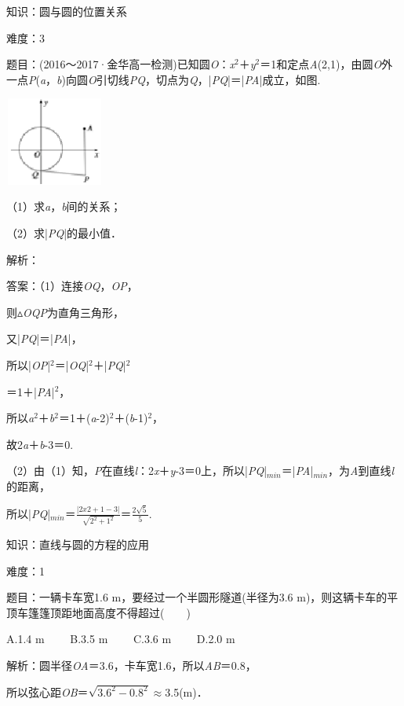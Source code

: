 \documentclass{article} %
\begin{document}
知识：圆与圆的位置关系

难度：3

题目：(2016～2017·金华高一检测)已知圆\textit{O}：\textit{x}${}^{2}$＋\textit{y}${}^{2}$＝1和定点\textit{A}(2,1)，由圆\textit{O}外一点\textit{P}(\textit{a}，\textit{b})向圆\textit{O}引切线\textit{PQ}，切点为\textit{Q}，|\textit{PQ}|＝|\textit{PA}|成立，如图.

\includegraphics*[width=1.28in, height=1.14in, keepaspectratio=false]{image295}

（1）求\textit{a}，\textit{b}间的关系；

（2）求|\textit{PQ}|的最小值．

解析：

答案：（1）连接\textit{OQ}，\textit{OP}，

则$\mathrm{\vartriangle}$\textit{OQP}为直角三角形，

又|\textit{PQ}|＝|\textit{PA}|，

所以|\textit{OP}|${}^{2}$＝|\textit{OQ}|${}^{2}$＋|\textit{PQ}|${}^{2}$

＝1＋|\textit{PA}|${}^{2}$，

所以\textit{a}${}^{2}$＋\textit{b}${}^{2}$＝1＋(\textit{a}-2)${}^{2}$＋(\textit{b}-1)${}^{2}$，

故2\textit{a}＋\textit{b}-3＝0.

（2）由（1）知，\textit{P}在直线\textit{l}：2\textit{x}＋\textit{y}-3＝0上，所以|\textit{PQ}|${}_{min}$＝|\textit{PA}|${}_{min}$，为\textit{A}到直线\textit{l}的距离，

所以|\textit{PQ}|${}_{min}$＝$\frac{|2x2+1-3|}{\sqrt{2^2+1^2}}$＝$\frac{2\sqrt{5}}{5}$.

知识：直线与圆的方程的应用

难度：1

题目：一辆卡车宽1.6 m，要经过一个半圆形隧道(半径为3.6 m)，则这辆卡车的平顶车篷篷顶距地面高度不得超过(　　)

A.1.4 m　　 B.3.5 m　　 C.3.6 m　　 D.2.0 m

解析：圆半径\textit{OA}＝3.6，卡车宽1.6，所以\textit{AB}＝0.8，

所以弦心距\textit{OB}＝$\sqrt{3.6^2-0.8^2}$$\mathrm{\approx}$3.5(m)．
\end{document}
